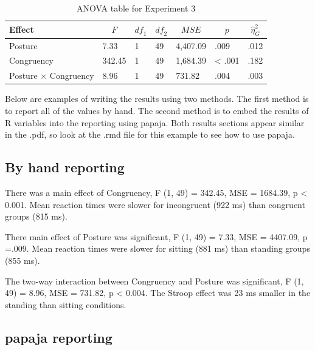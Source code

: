 \documentclass[man]{apa6}
\begin{document}
\begin{table}[tbp]
\begin{center}
\begin{threeparttable}
\caption{\label{tab:aovtable}ANOVA table for Experiment 3}
\begin{tabular}{lllllll}
\toprule
Effect & \multicolumn{1}{c}{$F$} & \multicolumn{1}{c}{$\mathit{df}_1$} & \multicolumn{1}{c}{$\mathit{df}_2$} & \multicolumn{1}{c}{$\mathit{MSE}$} & \multicolumn{1}{c}{$p$} & \multicolumn{1}{c}{$\hat{\eta}^2_G$}\\
\midrule
Posture & 7.33 & 1 & 49 & 4,407.09 & .009 & .012\\
Congruency & 342.45 & 1 & 49 & 1,684.39 & < .001 & .182\\
Posture $\times$ Congruency & 8.96 & 1 & 49 & 731.82 & .004 & .003\\
\bottomrule
\end{tabular}
\end{threeparttable}
\end{center}
\end{table}

Below are examples of writing the results using two methods. The first method is to report all of the values by hand. The second method is to embed the results of R variables into the reporting using papaja. Both results sections appear similar in the .pdf, so look at the .rmd file for this example to see how to use papaja.

\hypertarget{by-hand-reporting}{%
\subsection{By hand reporting}\label{by-hand-reporting}}

There was a main effect of Congruency, F (1, 49) = 342.45, MSE = 1684.39, p \textless{} 0.001. Mean reaction times were slower for incongruent (922 ms) than congruent groups (815 ms).

There main effect of Posture was significant, F (1, 49) = 7.33, MSE = 4407.09, p =.009. Mean reaction times were slower for sitting (881 ms) than standing groups (855 ms).

The two-way interaction between Congruency and Posture was significant, F (1, 49) = 8.96, MSE = 731.82, p \textless{} 0.004. The Stroop effect was 23 ms smaller in the standing than sitting conditions.

\hypertarget{papaja-reporting}{%
\subsection{papaja reporting}\label{papaja-reporting}}
\end{document}
